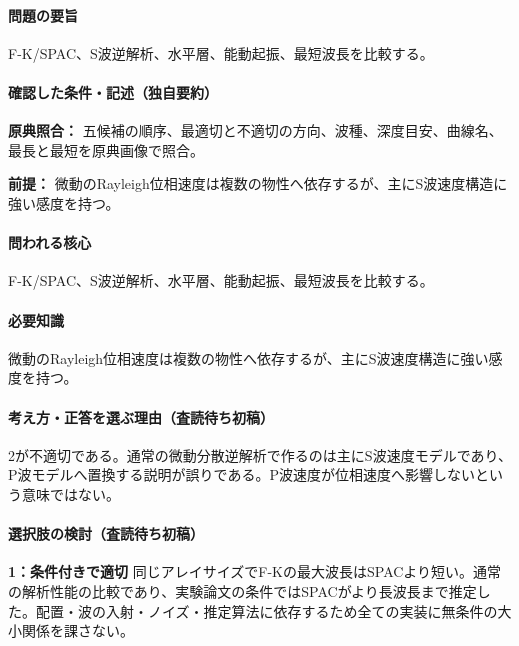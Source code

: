 \paragraph{問題の要旨} F-K/SPAC、S波逆解析、水平層、能動起振、最短波長を比較する。

\paragraph{確認した条件・記述（独自要約）}\mbox{}\par

\noindent\textbf{原典照合：} 五候補の順序、最適切と不適切の方向、波種、深度目安、曲線名、最長と最短を原典画像で照合。\par

\noindent\textbf{前提：} 微動のRayleigh位相速度は複数の物性へ依存するが、主にS波速度構造に強い感度を持つ。\par

\paragraph{問われる核心} F-K/SPAC、S波逆解析、水平層、能動起振、最短波長を比較する。

\paragraph{必要知識} 微動のRayleigh位相速度は複数の物性へ依存するが、主にS波速度構造に強い感度を持つ。

\paragraph{考え方・正答を選ぶ理由（査読待ち初稿）} 2が不適切である。通常の微動分散逆解析で作るのは主にS波速度モデルであり、P波モデルへ置換する説明が誤りである。P波速度が位相速度へ影響しないという意味ではない。

\paragraph{選択肢の検討（査読待ち初稿）}\mbox{}\par

\noindent\textbf{1：条件付きで適切} 同じアレイサイズでF-Kの最大波長はSPACより短い。通常の解析性能の比較であり、実験論文の条件ではSPACがより長波長まで推定した。配置・波の入射・ノイズ・推定算法に依存するため全ての実装に無条件の大小関係を課さない。\par

